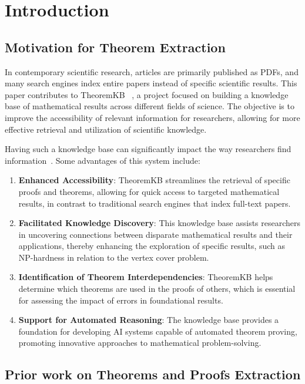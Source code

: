 \documentclass[runningheads]{llncs}
\begin{document}
\section{Introduction}
\subsection{Motivation for Theorem Extraction}
In contemporary scientific research, articles are primarily published as PDFs, and many 
search engines index entire papers instead of specific scientific results. This paper 
contributes to TheoremKB ~\cite{doceng_paper}, a project focused on building a knowledge base of mathematical 
results across different fields of science. The objective is to improve the accessibility of 
relevant information for researchers, allowing for more effective retrieval and utilization 
of scientific knowledge.

Having such a knowledge base can significantly impact the way researchers find information~\cite{mishra2024first}. 
Some advantages of this system include:

\begin{enumerate}
    \item \textbf{Enhanced Accessibility}: TheoremKB streamlines the retrieval of specific 
    proofs and theorems, allowing for quick access to targeted mathematical results, 
    in contrast to traditional search engines that index full-text papers.

    \item \textbf{Facilitated Knowledge Discovery}: This knowledge base assists researchers 
    in uncovering connections between disparate mathematical results and their applications, 
    thereby enhancing the exploration of specific results, such as NP-hardness in relation to 
    the vertex cover problem.

    \item \textbf{Identification of Theorem Interdependencies}: TheoremKB helps determine 
    which theorems are used in the proofs of others, which is essential for assessing the 
    impact of errors in foundational results.

    \item \textbf{Support for Automated Reasoning}: The knowledge base provides a foundation 
    for developing AI systems capable of automated theorem proving, promoting innovative 
    approaches to mathematical problem-solving.
\end{enumerate}

\subsection{Prior work on Theorems and Proofs Extraction}
\end{document}
